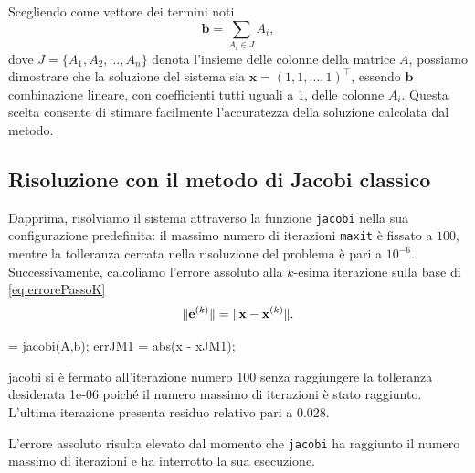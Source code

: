 Scegliendo come vettore dei termini noti
\begin{equation*}
    \mathbf{b} = \sum_ {A_{i} \in J} A_{i},
\end{equation*}
dove $J = \{A_{1}, A_{2},\dots,A_{n}\}$ denota l'insieme delle colonne della matrice $A$, possiamo dimostrare che la soluzione
del sistema sia $\mathbf{x} = (1, 1, ..., 1)^\top$, essendo $\mathbf{b}$ combinazione lineare, con coefficienti tutti uguali a $\num{1}$, delle colonne $A_{i}$. Questa scelta consente di stimare facilmente l'accuratezza della soluzione calcolata dal metodo.
\subsection{Risoluzione con il metodo di Jacobi classico}
Dapprima, risolviamo il sistema attraverso la funzione \lstinline{jacobi} nella sua configurazione predefinita:
il massimo numero di iterazioni \lstinline{maxit} \`e fissato a $\num{100}$, mentre la tolleranza cercata nella risoluzione del problema \`e pari a ${10}^{-6}$.\newline
    Successivamente, calcoliamo l'errore assoluto alla $k$-esima iterazione sulla base di \eqref{eq:errorePassoK}
    \begin{equation*}
        \lVert\mathbf{e}^{(k)}\rVert = \lVert\mathbf{x} - \mathbf{x}^{(k)}\rVert.
    \end{equation*}
    \begin{matlabcode}
     = jacobi(A,b);
    errJM1 = abs(x - xJM1);
    \end{matlabcode}
    \begin{matlaboutput}
    jacobi si è fermato all'iterazione numero 100 senza
    raggiungere la tolleranza desiderata 1e-06 poiché il
    numero massimo di iterazioni è stato raggiunto.
    L'ultima iterazione presenta residuo relativo
    pari a 0.028.
    \end{matlaboutput}
    L'errore assoluto risulta elevato dal momento che \lstinline{jacobi} ha raggiunto il numero massimo di iterazioni e ha interrotto la sua esecuzione.

